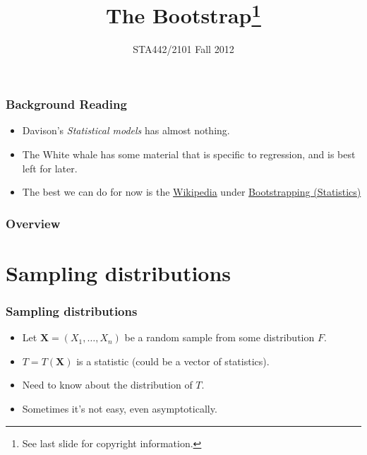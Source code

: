 \documentclass[serif]{beamer} %
\title{The Bootstrap\footnote{See last slide for copyright information.}}
\subtitle{STA442/2101 Fall 2012}
\date{} %
\begin{document}

\begin{frame}
  \titlepage
\end{frame}

\begin{frame}
\frametitle{Background Reading}
  \begin{itemize}
    \item Davison's \emph{Statistical models} has almost nothing.
    \item The White whale has some material that is specific to regression, and is best left for later.
    \item The best we can do for now is the \href{http://en.wikipedia.org}{Wikipedia}
          under 
         \href{http://en.wikipedia.org/wiki/Bootstrapping_(statistics)}
         {Bootstrapping (Statistics)}
  \end{itemize}
\end{frame}

\begin{frame}
\frametitle{Overview}
\tableofcontents
\end{frame}

\section{Sampling distributions}

\begin{frame}
\frametitle{Sampling distributions} 
  \begin{itemize}
    \item Let $\mathbf{X} = (X_1, \ldots, X_n)$ be a random sample from some distribution $F$.
    \item $T=T(\mathbf{X})$ is a statistic (could be a vector of statistics).
    \item Need to know about the distribution of $T$.
    \item Sometimes it's not easy, even asymptotically.
  \end{itemize}
\end{frame}
\end{document}
